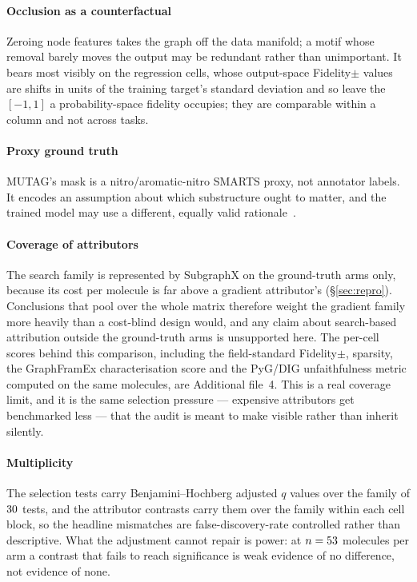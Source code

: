 \paragraph{Occlusion as a counterfactual} Zeroing node features takes the graph
off the data manifold; a motif whose removal barely moves the output may be
redundant rather than unimportant. It bears most visibly on the regression cells, whose
output-space Fidelity$\pm$ values are shifts in units of the training target's
standard deviation and so leave the $[-1,1]$ a probability-space fidelity
occupies; they are comparable within a column and not across tasks.

\paragraph{Proxy ground truth} MUTAG's mask is a nitro/aromatic-nitro SMARTS
proxy, not annotator labels. It encodes an assumption about which substructure
ought to matter, and the trained model may use a different, equally valid
rationale~\cite{faber}.

\paragraph{Coverage of attributors} The search family is represented by
SubgraphX on the ground-truth arms only, because its cost per molecule is far
above a gradient attributor's (\S\ref{sec:repro}). Conclusions that pool over the whole matrix therefore
weight the gradient family more heavily than a cost-blind design would, and any
claim about search-based attribution outside the ground-truth arms is
unsupported here. The per-cell scores behind this comparison, including the
field-standard Fidelity$\pm$, sparsity, the GraphFramEx characterisation score
and the PyG/DIG unfaithfulness metric computed on the same molecules, are
Additional file~4. This is a real coverage limit, and it is the same selection
pressure --- expensive attributors get benchmarked less --- that the audit is
meant to make visible rather than inherit silently.

\paragraph{Multiplicity} The selection tests carry Benjamini--Hochberg
adjusted $q$ values over the family of $30{}$ tests, and the
attributor contrasts carry them over the family within each cell block, so the
headline mismatches are false-discovery-rate controlled rather than descriptive.
What the adjustment cannot repair is power: at $n=53{}$ molecules per
arm a contrast that fails to reach significance is weak evidence of no
difference, not evidence of none.

